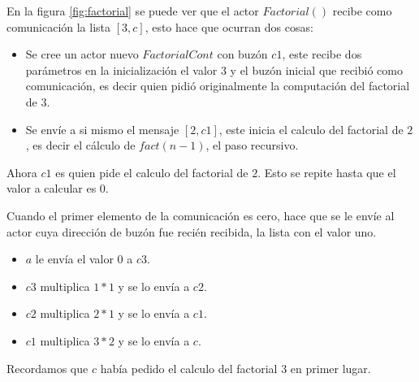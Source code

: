 En la figura \ref{fig:factorial} se puede ver que el actor $Factorial()$ recibe como comunicación la lista $[3,c]$, esto hace que ocurran dos cosas:

\begin{itemize}
\item Se cree un actor nuevo $FactorialCont$ con buzón $c1$, este recibe dos parámetros en la inicialización el valor $3$ y el buzón inicial que recibió como comunicación, es decir quien pidió originalmente la computación del factorial de $3$.

\item Se envíe a si mismo el mensaje $[2,c1]$, este inicia el calculo del factorial de $2$, es decir el cálculo de $fact(n-1)$, el paso recursivo.
\end{itemize}

Ahora $c1$ es quien pide el calculo del factorial de $2$. Esto se repite hasta que el valor a calcular es $0$.

Cuando el primer elemento de la comunicación es cero, hace que se le envíe al actor cuya dirección de buzón fue recién recibida, la lista con el valor uno. 

\begin{itemize}
\item $a$ le envía el valor $0$ a $c3$.
\item $c3$ multiplica $1*1$ y se lo envía a $c2$.
\item $c2$ multiplica $2*1$ y se lo envía a $c1$.
\item $c1$ multiplica $3*2$ y se lo envía a $c$.
\end{itemize}

Recordamos que $c$ había pedido el calculo del factorial $3$ en primer lugar.

